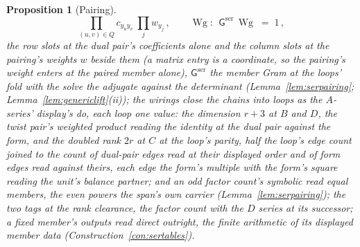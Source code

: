 \documentclass[11pt]{article}
\newtheorem{proposition}{Proposition}
\theoremstyle{definition}
\newcommand{\Wg}{\operatorname{Wg}}
\begin{document}
\begin{proposition}[Pairing]
\[\prod_{(u,v)\in Q}\!c_{y_uy_v}\
\prod_j w_{y_j}\,,
\qquad
\Wg:\ \ \mathsf G^{\mathrm{ser}}\,\Wg\;=\;1\,,
\]
the row slots at the dual pair's coefficients alone and the
column slots at the pairing's weights $w$ beside them (a matrix
entry is a coordinate, so the pairing's weight enters at the
paired member alone), $\mathsf G^{\mathrm{ser}}$ the member Gram
at the loops' fold with the solve the adjugate against the
determinant (Lemma~\ref{lem:serpairing};
Lemma~\ref{lem:genericlift}(ii)); the wirings close the chains
into loops as the $A$-series' display's do, each loop one value:
the dimension $r+3$ at $B$ and $D$, the twist pair's weighted
product reading the identity at the dual pair against the form,
and the doubled rank $2r$ at $C$ at the loop's parity, half the
loop's edge count joined to the count of dual-pair edges read at
their displayed order and of form edges read against theirs, each
edge the form's multiple with the form's square reading the
unit's balance partner; and an odd factor count's
symbolic read equal members, the even powers the span's own
carrier (Lemma~\ref{lem:serpairing}); the two tags at
the rank clearance, the factor count with the $D$ series at its
successor; a fixed member's outputs
read direct outright, the finite arithmetic of its displayed
member data (Construction~\ref{con:sertables}).
\end{proposition}
\end{document}
